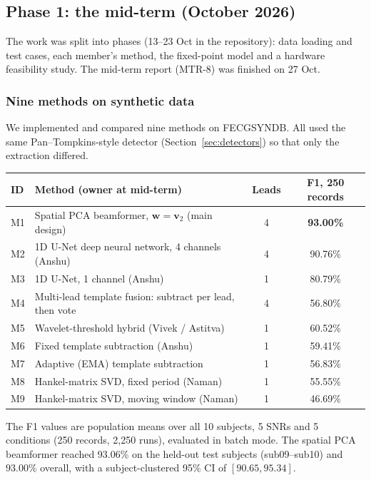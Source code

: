 \documentclass[11pt]{article}
\begin{document}
\subsection{Phase 1: the mid-term (October 2026)}
\label{sec:midterm}
The work was split into phases (13--23 Oct in the repository): data loading and test cases, each member's method, the fixed-point model and a hardware feasibility study. The mid-term report (MTR-8) was finished on 27 Oct.

\subsubsection{Nine methods on synthetic data}
We implemented and compared nine methods on FECGSYNDB. All used the same Pan--Tompkins-style detector (Section~\ref{sec:detectors}) so that only the extraction differed.

\begin{center}
\small
\begin{tabularx}{\linewidth}{@{}l X c c@{}}
\toprule
\textbf{ID} & \textbf{Method (owner at mid-term)} & \textbf{Leads} & \textbf{F1, 250 records} \\
\midrule
M1 & Spatial PCA beamformer, $\mathbf{w} = \mathbf{v}_2$ (main design) & 4 & \textbf{93.00\%} \\
M2 & 1D U-Net deep neural network, 4 channels (Anshu) & 4 & 90.76\% \\
M3 & 1D U-Net, 1 channel (Anshu) & 1 & 80.79\% \\
M4 & Multi-lead template fusion: subtract per lead, then vote & 4 & 56.80\% \\
M5 & Wavelet-threshold hybrid (Vivek / Astitva) & 1 & 60.52\% \\
M6 & Fixed template subtraction (Anshu) & 1 & 59.41\% \\
M7 & Adaptive (EMA) template subtraction & 1 & 56.83\% \\
M8 & Hankel-matrix SVD, fixed period (Naman) & 1 & 55.55\% \\
M9 & Hankel-matrix SVD, moving window (Naman) & 1 & 46.69\% \\
\bottomrule
\end{tabularx}
\end{center}
The F1 values are population means over all 10 subjects, 5 SNRs and 5 conditions (250 records, 2,250 runs), evaluated in batch mode. The spatial PCA beamformer reached 93.06\% on the held-out test subjects (sub09--sub10) and $93.00\%$ overall, with a subject-clustered 95\% CI of $[90.65, 95.34]$.
\end{document}
